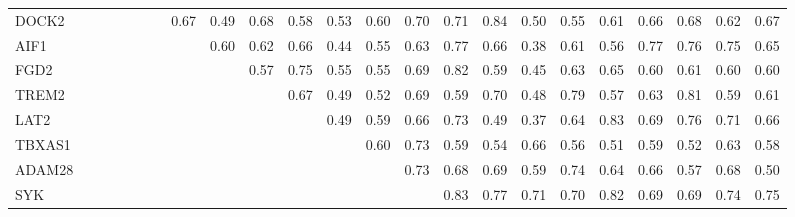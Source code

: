 \begin{longtable}{lrrrrrrrrrrrrrrrrrrrrrr}
DOCK2   &            &            &              &              &             &             &       0.67 &       0.49 &        0.68 &       0.58 &         0.53 &         0.60 &      0.70 &          0.71 &          0.84 &         0.50 &       0.55 &       0.61 &     0.66 &         0.68 &        0.62 &        0.67 \\
AIF1    &            &            &              &              &             &             &            &       0.60 &        0.62 &       0.66 &         0.44 &         0.55 &      0.63 &          0.77 &          0.66 &         0.38 &       0.61 &       0.56 &     0.77 &         0.76 &        0.75 &        0.65 \\
FGD2    &            &            &              &              &             &             &            &            &        0.57 &       0.75 &         0.55 &         0.55 &      0.69 &          0.82 &          0.59 &         0.45 &       0.63 &       0.65 &     0.60 &         0.61 &        0.60 &        0.60 \\
TREM2   &            &            &              &              &             &             &            &            &             &       0.67 &         0.49 &         0.52 &      0.69 &          0.59 &          0.70 &         0.48 &       0.79 &       0.57 &     0.63 &         0.81 &        0.59 &        0.61 \\
LAT2    &            &            &              &              &             &             &            &            &             &            &         0.49 &         0.59 &      0.66 &          0.73 &          0.49 &         0.37 &       0.64 &       0.83 &     0.69 &         0.76 &        0.71 &        0.66 \\
TBXAS1  &            &            &              &              &             &             &            &            &             &            &              &         0.60 &      0.73 &          0.59 &          0.54 &         0.66 &       0.56 &       0.51 &     0.59 &         0.52 &        0.63 &        0.58 \\
ADAM28  &            &            &              &              &             &             &            &            &             &            &              &              &      0.73 &          0.68 &          0.69 &         0.59 &       0.74 &       0.64 &     0.66 &         0.57 &        0.68 &        0.50 \\
SYK     &            &            &              &              &             &             &            &            &             &            &              &              &           &          0.83 &          0.77 &         0.71 &       0.70 &       0.82 &     0.69 &         0.69 &        0.74 &        0.75 \\

\end{longtable}
